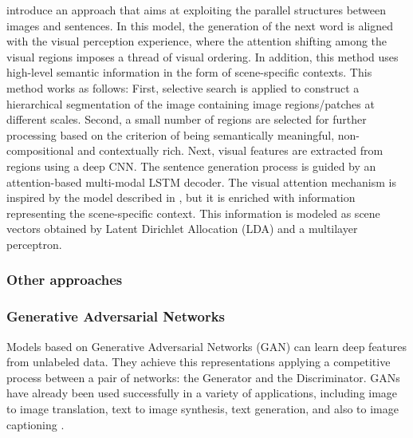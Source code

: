 \citet{Fu2017} introduce an approach that aims at exploiting the parallel structures between images and sentences. In this model, the generation of the next word is aligned with the visual perception experience, where the attention shifting among the visual regions imposes a thread of visual ordering. In addition, this method uses high-level semantic information in the form of scene-specific contexts. This method works as follows: First, selective search \citep{Uijlings2013} is applied to construct a hierarchical segmentation of the image containing image regions/patches at different scales. Second, a small number of regions are selected for further processing based on the criterion of being semantically meaningful, non-compositional and contextually rich. Next, visual features are extracted from regions using a deep CNN. The sentence generation process is guided by an attention-based multi-modal LSTM decoder. The visual attention mechanism is inspired by the model described in \citep{Xu2015}, but it is enriched with information representing the scene-specific context. This information is modeled as scene vectors obtained by Latent Dirichlet Allocation (LDA) \citep{Blei2003} and a multilayer perceptron.

\subsubsection{Other approaches}

\subsubsection{Generative Adversarial Networks}

Models based on Generative Adversarial Networks (GAN) can learn deep features from unlabeled data. They achieve this representations applying a competitive process between a pair of networks: the Generator and the Discriminator. GANs have already been used successfully in a variety of applications, including image to image translation, text to image synthesis, text generation, and also to image captioning \citep{Dai2017, Shetty2017}. 

